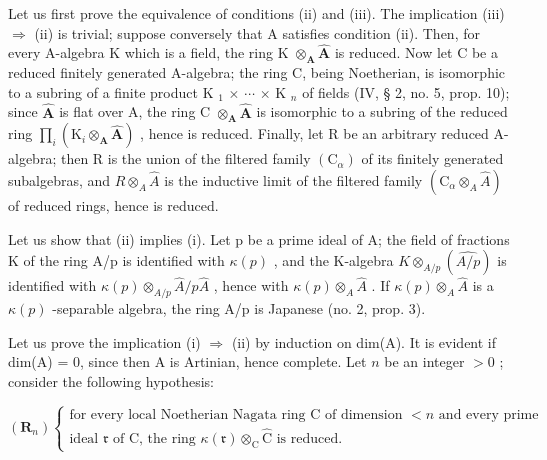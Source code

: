 Let us first prove the equivalence of conditions (ii) and (iii). The implication (iii) \(\Rightarrow\) (ii) is trivial; suppose conversely that A satisfies condition (ii). Then, for every A-algebra K which is a field, the ring K \(\otimes_{\mathbf{A}}\hat{\mathbf{A}}\) is reduced. Now let C be a reduced finitely generated A-algebra; the ring C, being Noetherian, is isomorphic to a subring of a finite product K \(_1\) \(\times\) \(\cdots\) \(\times\) K \(_n\) of fields (IV, § 2, no. 5, prop. 10); since \(\hat{\mathbf{A}}\) is flat over A, the ring C \(\otimes_{\mathbf{A}}\hat{\mathbf{A}}\) is isomorphic to a subring of the reduced ring \(\prod_{i}(\mathrm{K}_{i}\otimes_{\mathbf{A}}\hat{\mathbf{A}})\) , hence is reduced. Finally, let R be an arbitrary reduced A-algebra; then R is the union of the filtered family \((\mathrm{C}_{\alpha})\) of its finitely generated subalgebras, and \(R \otimes_{A} \hat{A}\) is the inductive limit of the filtered family \((\mathrm{C}_{\alpha} \otimes_{A} \hat{A})\) of reduced rings, hence is reduced.

Let us show that (ii) implies (i). Let p be a prime ideal of A; the field of fractions K of the ring A/p is identified with \(\kappa(p)\) , and the K-algebra \(K \otimes_{A/p} (\widehat{A/p})\) is identified with \(\kappa(p) \otimes_{A/p} \widehat{A}/p\widehat{A}\) , hence with \(\kappa(p) \otimes_{A} \widehat{A}\) . If \(\kappa(p) \otimes_{A} \widehat{A}\) is a \(\kappa(p)\) -separable algebra, the ring A/p is Japanese (no. 2, prop. 3).

Let us prove the implication (i) \(\Rightarrow\) (ii) by induction on dim(A). It is evident if dim(A) = 0, since then A is Artinian, hence complete. Let \(n\) be an integer \(>0\) ; consider the following hypothesis:

\((\mathbf{R}_n)\left\{
\begin{array}{ll}\text{for every local Noetherian Nagata ring C of dimension } < n\text{ and every prime}\\ \text{ideal } \mathfrak{r}\text{ of C, the ring }\kappa(\mathfrak{r})\otimes_{\mathrm{C}}\hat{\mathrm{C}}\text{ is reduced.} \end{array}
\right.\)

